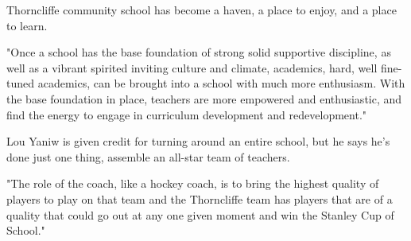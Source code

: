 Thorncliffe community school has become a haven, a place to enjoy, and a place to learn.

"Once a school has the base foundation of strong solid supportive discipline, as well as a vibrant spirited inviting culture and climate, academics, hard, well fine-tuned academics, can be brought into a school with much more enthusiasm. With the base foundation in place, teachers are more empowered and enthusiastic, and find the energy to engage in curriculum development and redevelopment."

Lou Yaniw is given credit for turning around an entire school, but he says he's done just one thing, assemble an all-star team of teachers.

"The role of the coach, like a hockey coach, is to bring the highest quality of players to play on that team and the Thorncliffe team has players that are of a quality that could go out at any one given moment and win the Stanley Cup of School."